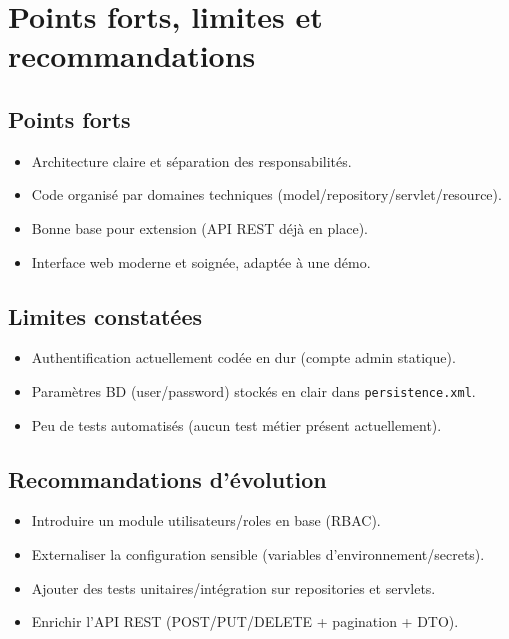 \documentclass[12pt,a4paper]{report}
\begin{document}
\chapter{Points forts, limites et recommandations}

\section{Points forts}
\begin{itemize}[leftmargin=1.2cm]
    \item Architecture claire et s\'eparation des responsabilit\'es.
    \item Code organis\'e par domaines techniques (model/repository/servlet/resource).
    \item Bonne base pour extension (API REST d\'ej\`a en place).
    \item Interface web moderne et soign\'ee, adapt\'ee \`a une d\'emo.
\end{itemize}

\section{Limites constat\'ees}
\begin{itemize}[leftmargin=1.2cm]
    \item Authentification actuellement cod\'ee en dur (compte admin statique).
    \item Param\`etres BD (user/password) stock\'es en clair dans \texttt{persistence.xml}.
    \item Peu de tests automatis\'es (aucun test m\'etier pr\'esent actuellement).
\end{itemize}

\section{Recommandations d'\'evolution}
\begin{itemize}[leftmargin=1.2cm]
    \item Introduire un module utilisateurs/roles en base (RBAC).
    \item Externaliser la configuration sensible (variables d'environnement/secrets).
    \item Ajouter des tests unitaires/int\'egration sur repositories et servlets.
    \item Enrichir l'API REST (POST/PUT/DELETE + pagination + DTO).
\end{itemize}
\end{document}
